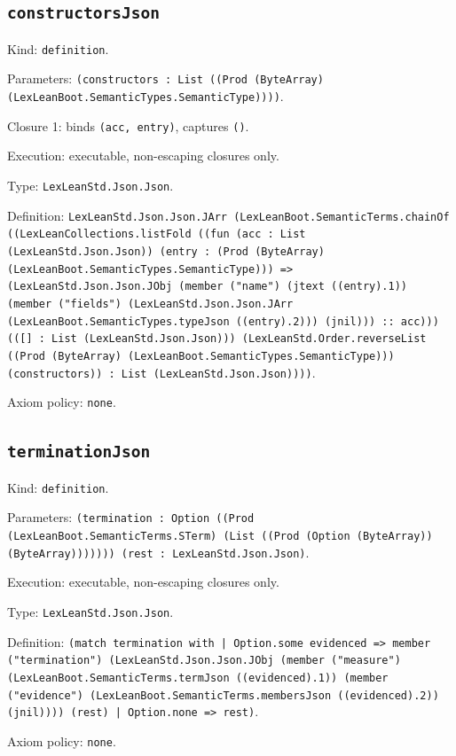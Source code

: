 \documentclass[11pt]{article}
\begin{document}
\subsection*{\texttt{constructorsJson}}
\noindent Kind: \texttt{definition}.\par
\noindent Parameters: \texttt{(constructors : List ((Prod (ByteArray) (LexLeanBoot.SemanticTypes.SemanticType))))}.\par
\noindent Closure 1: binds \texttt{(acc, entry)}, captures \texttt{()}.\par
\noindent Execution: executable, non-escaping closures only.\par
\noindent Type: \texttt{LexLeanStd.Json.Json}.\par
\noindent Definition: \texttt{LexLeanStd.Json.Json.JArr (LexLeanBoot.SemanticTerms.chainOf ((LexLeanCollections.listFold ((fun (acc : List (LexLeanStd.Json.Json)) (entry : (Prod (ByteArray) (LexLeanBoot.SemanticTypes.SemanticType))) => (LexLeanStd.Json.Json.JObj (member ("name") (jtext ((entry).1)) (member ("fields") (LexLeanStd.Json.Json.JArr (LexLeanBoot.SemanticTypes.typeJson ((entry).2))) (jnil))) :: acc))) (([] : List (LexLeanStd.Json.Json))) (LexLeanStd.Order.reverseList ((Prod (ByteArray) (LexLeanBoot.SemanticTypes.SemanticType))) (constructors)) : List (LexLeanStd.Json.Json))))}.\par
\noindent Axiom policy: \texttt{none}.\par
\subsection*{\texttt{terminationJson}}
\noindent Kind: \texttt{definition}.\par
\noindent Parameters: \texttt{(termination : Option ((Prod (LexLeanBoot.SemanticTerms.STerm) (List ((Prod (Option (ByteArray)) (ByteArray))))))) (rest : LexLeanStd.Json.Json)}.\par
\noindent Execution: executable, non-escaping closures only.\par
\noindent Type: \texttt{LexLeanStd.Json.Json}.\par
\noindent Definition: \texttt{(match termination with | Option.some evidenced => member ("termination") (LexLeanStd.Json.Json.JObj (member ("measure") (LexLeanBoot.SemanticTerms.termJson ((evidenced).1)) (member ("evidence") (LexLeanBoot.SemanticTerms.membersJson ((evidenced).2)) (jnil)))) (rest) | Option.none => rest)}.\par
\noindent Axiom policy: \texttt{none}.\par
\end{document}
